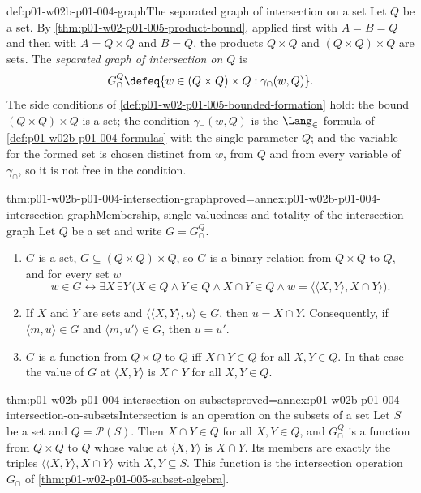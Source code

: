 \begin{hbdefinition}{def:p01-w02b-p01-004-graph}{The separated graph of intersection on a set}
Let \(Q\) be a set. By \cref{thm:p01-w02-p01-005-product-bound}, applied first
with \(A=B=Q\) and then with \(A=Q\times Q\) and \(B=Q\), the products
\(Q\times Q\) and \((Q\times Q)\times Q\) are sets. The \emph{separated graph
of intersection on \(Q\)} is
\[
  G^{Q}_{\cap}\defeq
  \{w\in(Q\times Q)\times Q:\gamma_{\cap}(w,Q)\}.
\]
The side conditions of \cref{def:p01-w02-p01-005-bounded-formation} hold: the
bound \((Q\times Q)\times Q\) is a set; the condition \(\gamma_{\cap}(w,Q)\) is
the \(\Lang_{\in}\)-formula of \cref{def:p01-w02b-p01-004-formulas} with the
single parameter \(Q\); and the variable for the formed set is chosen distinct
from \(w\), from \(Q\) and from every variable of \(\gamma_{\cap}\), so it is
not free in the condition.
\end{hbdefinition}

\begin{hbtheorem}{thm:p01-w02b-p01-004-intersection-graph}{proved=annex:p01-w02b-p01-004-intersection-graph}{Membership, single-valuedness and totality of the intersection graph}
Let \(Q\) be a set and write \(G=G^{Q}_{\cap}\).
\begin{enumerate}
  \item \(G\) is a set, \(G\subseteq(Q\times Q)\times Q\), so \(G\) is a binary
        relation from \(Q\times Q\) to \(Q\), and for every set \(w\)
        \[
          w\in G\leftrightarrow\exists X\,\exists Y\,
          \bigl(X\in Q\land Y\in Q\land X\cap Y\in Q\land
          w=\langle\langle X,Y\rangle,X\cap Y\rangle\bigr).
        \]
  \item If \(X\) and \(Y\) are sets and
        \(\langle\langle X,Y\rangle,u\rangle\in G\), then \(u=X\cap Y\).
        Consequently, if \(\langle m,u\rangle\in G\) and
        \(\langle m,u'\rangle\in G\), then \(u=u'\).
  \item \(G\) is a function from \(Q\times Q\) to \(Q\) iff
        \(X\cap Y\in Q\) for all \(X,Y\in Q\). In that case the value of \(G\)
        at \(\langle X,Y\rangle\) is \(X\cap Y\) for all \(X,Y\in Q\).
\end{enumerate}
\end{hbtheorem}

\begin{hbcorollary}{thm:p01-w02b-p01-004-intersection-on-subsets}{proved=annex:p01-w02b-p01-004-intersection-on-subsets}{Intersection is an operation on the subsets of a set}
Let \(S\) be a set and \(Q=\mathcal P(S)\). Then \(X\cap Y\in Q\) for all
\(X,Y\in Q\), and \(G^{Q}_{\cap}\) is a function from \(Q\times Q\) to \(Q\)
whose value at \(\langle X,Y\rangle\) is \(X\cap Y\). Its members are exactly
the triples \(\langle\langle X,Y\rangle,X\cap Y\rangle\) with
\(X,Y\subseteq S\). This function is the intersection operation \(G_{\cap}\)
of \cref{thm:p01-w02-p01-005-subset-algebra}.
\end{hbcorollary}

